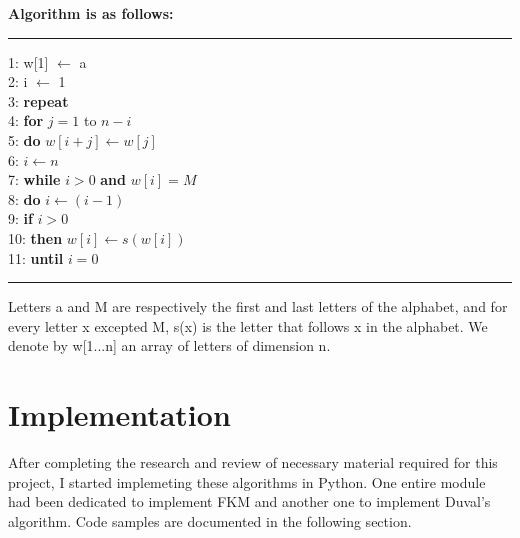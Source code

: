 \documentclass[12pt,twoside]{article}
\begin{document}
\textbf{Algorithm is as follows:} \\

\noindent\rule{16.5cm}{1.0pt}
1: w[1] $\leftarrow$ a\\
2: i $\leftarrow$ 1\\
3: \textbf{repeat}\\
4: \hspace{0.5cm} \textbf{for} $j = 1$ to $n - i$\\
5: \hspace{1.0cm} \textbf{do} $w[i+j] \leftarrow w[j]$\\
6: \hspace{0.5cm} $i \leftarrow n$\\
7: \hspace{0.5cm} \textbf{while} $i > 0$ \textbf{and} $w[i] = M$\\
8: \hspace{1.0cm} \textbf{do} $i \leftarrow (i - 1)$\\
9: \hspace{0.5cm} \textbf{if} $i > 0$ \\
10: \hspace{1.0cm} \textbf{then} $w[i] \leftarrow s(w[i])$\\
11: \textbf{until} $i = 0$\\
\noindent\rule{16.5cm}{1.0pt}
Letters a and M are respectively the first and last letters of the alphabet, and for every letter x excepted M, s(x) is the letter that follows x in the alphabet. We denote by w[1...n] an array of letters of dimension n. \\
\section{Implementation}
After completing the research and review of necessary material required for this project, I started implemeting these algorithms in Python. One entire module had been dedicated to implement FKM and another one to implement Duval's algorithm. Code samples are documented in the following section.
\end{document}
